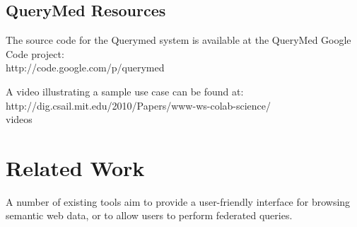 \documentclass{www2010-submission}
\begin{document}



\subsection{QueryMed Resources}

The source code for the Querymed system is available at the QueryMed Google Code project: \\
http://code.google.com/p/querymed

\smallskip

A video illustrating a sample use case can be found at: \\
http://dig.csail.mit.edu/2010/Papers/www-ws-colab-science/\\
videos



\section{Related Work}
\label{related}

A number of existing tools aim to provide a user-friendly interface for browsing semantic web data, or to allow users to perform federated queries. 
\end{document}
